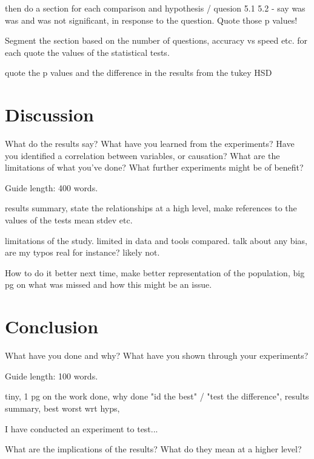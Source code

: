 \documentclass{csfourzero}
\begin{document}
then do a section for each comparison and hypothesis / quesion 5.1 5.2 - say was was and was not significant, in response to the question. Quote those p values!

Segment the section based on the number of questions, accuracy vs speed etc. for each quote the values of the statistical tests.

quote the p values and the difference in the results from the tukey HSD

\section{Discussion}
\label{sec:discuss}

What do the results say? What have you learned from the
experiments? Have you identified a correlation between variables, or
causation? What are the limitations of what you've done? What further
experiments might be of benefit?

Guide length: 400 words.

results summary, state the relationships at a high level, make references to the values of the tests mean stdev etc.

limitations of the study. limited in data and tools compared. talk about any bias, are my typos real for instance? likely not.

How to do it better next time, make better representation of the population, big pg on what was missed and how this might be an issue.

\section{Conclusion}
\label{sec:conc}

What have you done and why? What have you shown through your
experiments?

Guide length: 100 words.

tiny, 1 pg on the work done, why done "id the best" / "test the difference", results summary, best worst wrt hyps,

I have conducted an experiment to test...

What are the implications of the results? What do they mean at a higher level?


\end{document}

